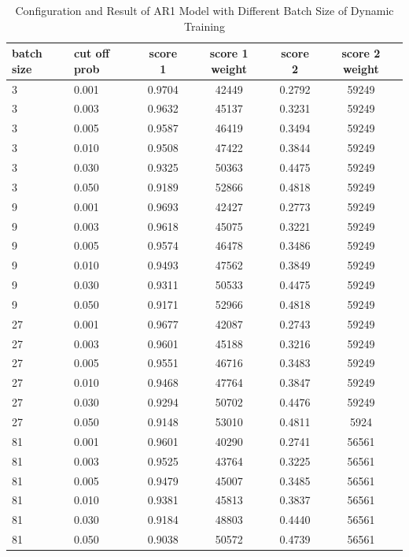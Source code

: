 \documentclass{article}
\begin{document}
\begin{table}[htbp]
  \begin{center}
    \caption{Configuration and Result of AR1 Model with Different Batch Size of Dynamic Training}
    \label{tab:tab1.5.2}
    \begin{tabular}{l|l|*{4}{c}} \textbf{batch size} & \textbf{cut off prob} &
      \textbf{score 1} & \textbf{score 1 weight} & \textbf{score 2} &
      \textbf{score 2 weight} \\
      \hline
      3 & 0.001 & 0.9704 & 42449 & 0.2792 & 59249\\
      3 & 0.003 & 0.9632 & 45137 & 0.3231 & 59249\\
      3 & 0.005 & 0.9587 & 46419 & 0.3494 & 59249\\
      3 & 0.010 & 0.9508 & 47422 & 0.3844 & 59249\\
      3 & 0.030 & 0.9325 & 50363 & 0.4475 & 59249\\
      3 & 0.050 & 0.9189 & 52866 & 0.4818 & 59249\\
      9 & 0.001 & 0.9693 & 42427 & 0.2773 & 59249\\
      9 & 0.003 & 0.9618 & 45075 & 0.3221 & 59249\\
      9 & 0.005 & 0.9574 & 46478 & 0.3486 & 59249\\
      9 & 0.010 & 0.9493 & 47562 & 0.3849 & 59249\\
      9 & 0.030 & 0.9311 & 50533 & 0.4475 & 59249\\
      9 & 0.050 & 0.9171 & 52966 & 0.4818 & 59249\\
      27 & 0.001 & 0.9677 & 42087 & 0.2743 & 59249\\
      27 & 0.003 & 0.9601 & 45188 & 0.3216 & 59249\\
      27 & 0.005 & 0.9551 & 46716 & 0.3483 & 59249\\
      27 & 0.010 & 0.9468 & 47764 & 0.3847 & 59249\\
      27 & 0.030 & 0.9294 & 50702 & 0.4476 & 59249\\
      27 & 0.050 & 0.9148 & 53010 & 0.4811 & 5924\\
      81 & 0.001 & 0.9601 & 40290 & 0.2741 & 56561\\
      81 & 0.003 & 0.9525 & 43764 & 0.3225 & 56561\\
      81 & 0.005 & 0.9479 & 45007 & 0.3485 & 56561\\
      81 & 0.010 & 0.9381 & 45813 & 0.3837 & 56561\\
      81 & 0.030 & 0.9184 & 48803 & 0.4440 & 56561\\
      81 & 0.050 & 0.9038 & 50572 & 0.4739 & 56561\\
    \end{tabular}
  \end{center}
\end{table}
\end{document}
